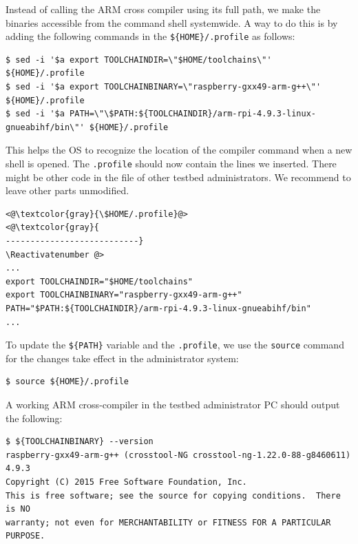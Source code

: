 \documentclass[electronics,article,accept,moreauthors,pdftex,10pt,a4paper]{mdpi}
\theoremstyle{mdpi}
\newcounter{ex}
\newcounter{re}
\theoremstyle{mdpidefinition}
\begin{document}
Instead of calling the ARM cross compiler using its full path, we make
the binaries accessible from the command shell systemwide. A way to do
this is by adding the following commands in the \texttt{\$\{HOME\}/.profile}
as follows:

\begin{lstlisting}[]
$ sed -i '$a export TOOLCHAINDIR=\"$HOME/toolchains\"' ${HOME}/.profile
$ sed -i '$a export TOOLCHAINBINARY=\"raspberry-gxx49-arm-g++\"' ${HOME}/.profile
$ sed -i '$a PATH=\"\$PATH:${TOOLCHAINDIR}/arm-rpi-4.9.3-linux-gnueabihf/bin\"' ${HOME}/.profile
\end{lstlisting}
\FloatBarrier
\vspace{-5mm}

This helps the OS to recognize the location of the compiler
command when a new shell is opened. The \texttt{.profile} should now
contain the lines we inserted. There might be other
code in the file of other testbed administrators. We recommend to leave
other parts unmodified.
\Suppressnumber\begin{lstlisting}[]
<@\textcolor{gray}{\$HOME/.profile}@>
<@\textcolor{gray}{
---------------------------}
\Reactivatenumber @>
...
export TOOLCHAINDIR="$HOME/toolchains"
export TOOLCHAINBINARY="raspberry-gxx49-arm-g++"
PATH="$PATH:${TOOLCHAINDIR}/arm-rpi-4.9.3-linux-gnueabihf/bin"
...
\end{lstlisting}
\FloatBarrier
\vspace{-5mm}

To update the \texttt{\$\{PATH\}} variable and the \texttt{.profile}, we
use the \texttt{source} command for the changes take effect in the
administrator system:
\begin{lstlisting}[]
$ source ${HOME}/.profile
\end{lstlisting}
\FloatBarrier
\vspace{-5mm}

A working ARM cross-compiler in the testbed administrator PC should
output the following:

\begin{lstlisting}[]
$ ${TOOLCHAINBINARY} --version
raspberry-gxx49-arm-g++ (crosstool-NG crosstool-ng-1.22.0-88-g8460611) 4.9.3
Copyright (C) 2015 Free Software Foundation, Inc.
This is free software; see the source for copying conditions.  There is NO
warranty; not even for MERCHANTABILITY or FITNESS FOR A PARTICULAR PURPOSE.
\end{lstlisting}
\FloatBarrier
\vspace{-5mm}
\end{document}

